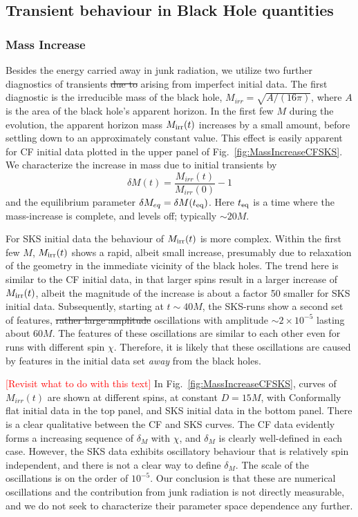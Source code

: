 \documentclass[aps,prd,amsmath,floatfix,twocolumn,superscriptaddress,nofootinbib,showpacs]{revtex4-1}
\theoremstyle{plain}
\theoremstyle{definition}
\newcommand{\red}[1]{\textcolor{Red}{#1}}
\newcommand{\harald}[1]{\textcolor{OliveGreen}{#1}}
\begin{document}
\subsection{Transient behaviour in Black Hole quantities}

\subsubsection{Mass Increase}
Besides the energy carried away in junk radiation, we utilize two further
diagnostics of transients \harald{\sout{due to} arising from} imperfect initial data.
The first diagnostic is the irreducible
mass of the black hole, $M_{irr} = \sqrt{A/(16\pi)}$, where $A$
is the area of the black hole's apparent horizon. 
In the first few $M$ during the evolution, the apparent horizon mass
$M_{\rm irr}(t)$ increases by a small amount, before settling down to
an approximately constant value. This effect is easily apparent for CF initial data plotted in the upper panel of Fig.~\ref{fig:MassIncreaseCFSKS}.
We characterize the increase in mass due to initial transients by 
\begin{equation}
\delta M(t)=\frac{M_{irr}(t)}{M_{irr}(0)}-1
\end{equation}
and the equilibrium parameter $\delta M_{eq} = \delta M(t_{\rm eq})$.
Here $t_{\rm eq}$ is a time where the mass-increase is complete, and
levels off; typically $\sim20M$. 

For SKS initial data the behaviour of $M_{\rm irr}(t)$ is more
  complex.  Within the first few $M$, $M_{\rm irr}(t)$ shows a rapid,
  albeit small increase, presumably due to relaxation of the geometry
  in the immediate vicinity of the black holes.  The trend here is
  similar to the CF initial data, in that larger spins result in a
  larger increase of $M_{\rm irr}(t)$, albeit the magnitude of the
  increase is about a factor 50 smaller for SKS initial data.
  Subsequently, starting at $t\sim 40M$, the SKS-runs show a second
  set of features, \harald{\sout{rather large amplitude}} oscillations \harald{with amplitude $\sim 2\times 10^{-5}$} lasting about
  $60M$.  The features of these oscillations are similar to each other even for runs with different spin $\chi$.  Therefore, it is
  likely that these oscillations are caused by features in the initial
  data set {\em away} from the black holes.

{\footnotesize \red{[Revisit what to do with this text]}
In Fig.~\ref{fig:MassIncreaseCFSKS}, curves of $M_{irr}(t)$ are
shown at different spins, at constant $D=15M$, with Conformally flat
initial data in the top panel, and SKS initial data in the bottom
panel. There is a clear qualitative between the CF and SKS curves. The CF data evidently forms a increasing sequence of $\delta_M$ with
$\chi$, and $\delta_M$ is clearly well-defined in each case. However,
the SKS data exhibits oscillatory behaviour that is relatively spin
independent, and there is not a clear way to define $\delta_M$. The
scale of the oscillations is on the order of $10^{-5}$. Our conclusion
is that these are numerical oscillations and the contribution from
junk radiation is not directly measurable, and we do not seek to
characterize their parameter space dependence any further.}
\end{document}
